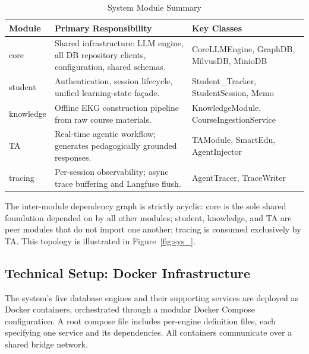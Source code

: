 \begin{table}[H]
\centering
\caption{System Module Summary}\label{tab:modules}
\begin{tabular}{p{2.2cm} p{5cm} p{5cm}}
\hline
{Module} & {Primary Responsibility} & {Key Classes} \\
\hline
 {core}      & Shared infrastructure: LLM engine, all DB repository clients, configuration, shared schemas. &  {CoreLLMEngine},  {GraphDB},  {MilvusDB},  {MinioDB} \\
 {student}   & Authentication, session lifecycle, unified learning-state façade.   &  {Student\_Tracker},  {StudentSession},  {Memo} \\
 {knowledge} & Offline EKG construction pipeline from raw course materials.        &  {KnowledgeModule},  {CourseIngestionService} \\
 {TA}        & Real-time agentic workflow; generates pedagogically grounded responses. &  {TAModule},  {SmartEdu},  {AgentInjector} \\
 {tracing}   & Per-session observability; async trace buffering and Langfuse flush. &  {AgentTracer},  {TraceWriter} \\
\hline
\end{tabular}
\end{table}

The inter-module dependency graph is strictly acyclic:  {core} is the sole shared foundation depended on by all other modules;  {student},  {knowledge}, and  {TA} are peer modules that do not import one another;  {tracing} is consumed exclusively by  {TA}. 
This topology is illustrated in Figure~\ref{fig:sys_}.



\subsection{Technical Setup: Docker Infrastructure}

The system's five database engines and their supporting services are deployed as Docker containers, orchestrated through a modular Docker Compose configuration. A root compose file includes per-engine definition files, each specifying one service and its dependencies. All containers communicate over a shared bridge network.

